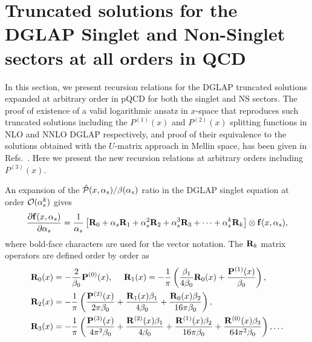 \documentclass[12pt,notitlepage,aps,preprintnumbers,superscriptaddress,nofootinbib,aps,prd,floatfix]{revtex4-2}
\renewenvironment{eqnarray}{\begin{equation}\begin{aligned}}
{\end{aligned}\end{equation}}
\begin{document}
\section{Truncated solutions for the DGLAP Singlet and Non-Singlet sectors at all orders in QCD}
\label{S-NS-trunc-sol}

In this section, we present recursion relations for the DGLAP truncated solutions expanded at arbitrary order in pQCD for both the singlet and NS sectors. The proof of existence of a valid logarithmic ansatz in $x$-space that reproduces such truncated solutions including the $P^{(1)}(x)$ and $P^{(2)}(x)$ splitting functions in NLO and NNLO DGLAP respectively, and proof of their equivalence to the solutions obtained with the $U$-matrix approach in Mellin space, has been given in Refs.~\cite{Cafarella:2005zj,Cafarella:2008du,Guzzi:2006wx}. Here we present the new recursion relations at arbitrary orders including $P^{(3)}(x)$. 

An expansion of the ${\cal \hat P}(x,\alpha_s)/\beta(\alpha_s)$ ratio in the DGLAP singlet equation at order ${\cal O}(\alpha_s^k)$ gives 
%
\begin{eqnarray}
\frac{\partial{{\bf f}(x,\alpha_s)}}{\partial\alpha_s}=
\frac{1}{\alpha_s}\left[{\bf R}_0+\alpha_s {\bf R}_1 +\alpha_s^2
{\bf R}_2+\alpha_s^3
{\bf R}_3 + \dots + \alpha_s^k {\bf R}_k \right]\otimes {\bf f}(x,\alpha_s),
\label{N3LOsinglet}
\end{eqnarray}
%
where bold-face characters are used for the vector notation. The ${\bf R}_k$ matrix operators are defined order by order as
%
\begin{eqnarray}
{\bf R}_0(x)&=-\frac{2}{\beta_0}{\bf P}^{(0)}(x),
~~~~
{\bf R}_1(x)=-\frac{1}{\pi}\left(\frac{\beta_1}{4\beta_0}{\bf R}_0(x) +
\frac{{\bf P}^{(1)}(x)}{\beta_0}\right),
\\
{\bf R}_2(x)&=-\frac{1}{\pi}\left(\frac{{\bf P}^{(2)}(x)}{2\pi\beta_0}
+\frac{{\bf R}_1(x) \beta_1}{4\beta_0}+\frac{{\bf R}_0(x) \beta_2}{16\pi\beta_0}\right), 
\nonumber\\
{\bf R}_3(x) &= -\frac{1}{\pi}\left(\frac{{\bf P}^{(3)}(x)}{4\pi^2\beta_0} +\frac{{\bf R}^{(2)}(x)\beta_1}{4\beta_0} + \frac{{\bf R}^{(1)}(x)\beta_2}{16\pi\beta_0}+\frac{{\bf R}^{(0)}(x)\beta_3}{64\pi^2\beta_0}\right),
\dots
\end{eqnarray}
%
\end{document}
